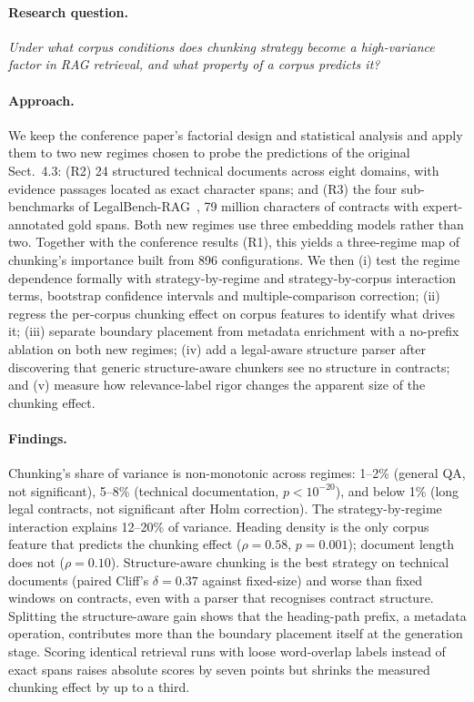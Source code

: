 \documentclass[runningheads]{llncs}
\begin{document}
\paragraph{Research question.} \emph{Under what corpus conditions does chunking strategy become a high-variance factor in RAG retrieval, and what property of a corpus predicts it?}

\paragraph{Approach.} We keep the conference paper's factorial design and statistical analysis and apply them to two new regimes chosen to probe the predictions of the original Sect.~4.3: (R2) 24 structured technical documents across eight domains, with evidence passages located as exact character spans; and (R3) the four sub-benchmarks of LegalBench-RAG~\cite{pipitone2024legalbenchrag}, 79 million characters of contracts with expert-annotated gold spans. Both new regimes use three embedding models rather than two. Together with the conference results (R1), this yields a three-regime map of chunking's importance built from 896 configurations. We then (i) test the regime dependence formally with strategy-by-regime and strategy-by-corpus interaction terms, bootstrap confidence intervals and multiple-comparison correction; (ii) regress the per-corpus chunking effect on corpus features to identify what drives it; (iii) separate boundary placement from metadata enrichment with a no-prefix ablation on both new regimes; (iv) add a legal-aware structure parser after discovering that generic structure-aware chunkers see no structure in contracts; and (v) measure how relevance-label rigor changes the apparent size of the chunking effect.

\paragraph{Findings.} Chunking's share of variance is non-monotonic across regimes: 1--2\% (general QA, not significant), 5--8\% (technical documentation, $p<10^{-20}$), and below 1\% (long legal contracts, not significant after Holm correction). The strategy-by-regime interaction explains 12--20\% of variance. Heading density is the only corpus feature that predicts the chunking effect ($\rho=0.58$, $p=0.001$); document length does not ($\rho=0.10$). Structure-aware chunking is the best strategy on technical documents (paired Cliff's $\delta=0.37$ against fixed-size) and worse than fixed windows on contracts, even with a parser that recognises contract structure. Splitting the structure-aware gain shows that the heading-path prefix, a metadata operation, contributes more than the boundary placement itself at the generation stage. Scoring identical retrieval runs with loose word-overlap labels instead of exact spans raises absolute scores by seven points but shrinks the measured chunking effect by up to a third.
\end{document}
